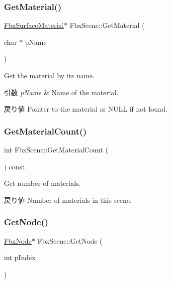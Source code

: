 \subsubsection{\texorpdfstring{Get\+Material()}{GetMaterial()}\hspace{0.1cm}{\footnotesize\ttfamily [2/2]}}
{\footnotesize\ttfamily \hyperlink{class_fbx_surface_material}{Fbx\+Surface\+Material}$\ast$ Fbx\+Scene\+::\+Get\+Material (\begin{DoxyParamCaption}\item[{char $\ast$}]{p\+Name }\end{DoxyParamCaption})}

Get the material by its name. 
\begin{DoxyParams}{引数}
{\em p\+Name} & Name of the material. \\
\hline
\end{DoxyParams}
\begin{DoxyReturn}{戻り値}
Pointer to the material or {\ttfamily N\+U\+LL} if not found. 
\end{DoxyReturn}
\mbox{\label{class_fbx_scene_a098bcfeab04d64d1b7f900a09c09f381}} 
\subsubsection{\texorpdfstring{Get\+Material\+Count()}{GetMaterialCount()}}
{\footnotesize\ttfamily int Fbx\+Scene\+::\+Get\+Material\+Count (\begin{DoxyParamCaption}{ }\end{DoxyParamCaption}) const}

Get number of materials. \begin{DoxyReturn}{戻り値}
Number of materials in this scene. 
\end{DoxyReturn}
\mbox{\label{class_fbx_scene_a1ba0a3d043284ae7c488467feaf1a9f9}} 
\subsubsection{\texorpdfstring{Get\+Node()}{GetNode()}}
{\footnotesize\ttfamily \hyperlink{class_fbx_node}{Fbx\+Node}$\ast$ Fbx\+Scene\+::\+Get\+Node (\begin{DoxyParamCaption}\item[{int}]{p\+Index }\end{DoxyParamCaption})}


